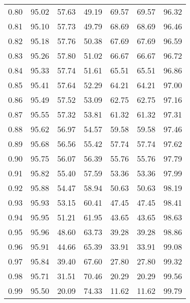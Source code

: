 \begin{tabular}{|c|c|c|c|c|c|c|}
      0.80 &     95.02 &     57.63 &      49.19 &   69.57 &      69.57 &         96.32 \\
      0.81 &     95.10 &     57.73 &      49.79 &   68.69 &      68.69 &         96.46 \\
      0.82 &     95.18 &     57.76 &      50.38 &   67.69 &      67.69 &         96.59 \\
      0.83 &     95.26 &     57.80 &      51.02 &   66.67 &      66.67 &         96.72 \\
      0.84 &     95.33 &     57.74 &      51.61 &   65.51 &      65.51 &         96.86 \\
      0.85 &     95.41 &     57.64 &      52.29 &   64.21 &      64.21 &         97.00 \\
      0.86 &     95.49 &     57.52 &      53.09 &   62.75 &      62.75 &         97.16 \\
      0.87 &     95.55 &     57.32 &      53.81 &   61.32 &      61.32 &         97.31 \\
      0.88 &     95.62 &     56.97 &      54.57 &   59.58 &      59.58 &         97.46 \\
      0.89 &     95.68 &     56.56 &      55.42 &   57.74 &      57.74 &         97.62 \\
      0.90 &     95.75 &     56.07 &      56.39 &   55.76 &      55.76 &         97.79 \\
      0.91 &     95.82 &     55.40 &      57.59 &   53.36 &      53.36 &         97.99 \\
      0.92 &     95.88 &     54.47 &      58.94 &   50.63 &      50.63 &         98.19 \\
      0.93 &     95.93 &     53.15 &      60.41 &   47.45 &      47.45 &         98.41 \\
      0.94 &     95.95 &     51.21 &      61.95 &   43.65 &      43.65 &         98.63 \\
      0.95 &     95.96 &     48.60 &      63.73 &   39.28 &      39.28 &         98.86 \\
      0.96 &     95.91 &     44.66 &      65.39 &   33.91 &      33.91 &         99.08 \\
      0.97 &     95.84 &     39.40 &      67.60 &   27.80 &      27.80 &         99.32 \\
      0.98 &     95.71 &     31.51 &      70.46 &   20.29 &      20.29 &         99.56 \\
      0.99 &     95.50 &     20.09 &      74.33 &   11.62 &      11.62 &         99.79 \\
\bottomrule
\end{tabular}
